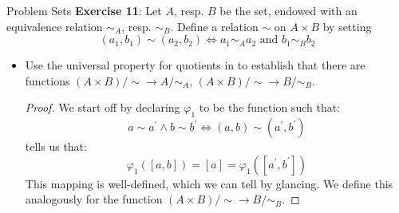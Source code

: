 \documentclass{report}
\begin{document}
\begin{exercises}{Problem Sets}
    \textbf{Exercise 11}: Let $A$, resp. $B$ be the set, endowed with an equivalence relation $\sim_{A}$, resp. $\sim_{B}$. Define a relation $\sim $ on $A \times B$ by setting
        \begin{equation*}
            (a_{1}, b_{1}) \sim (a_{2}, b_{2}) \iff a_{1} \sim_{A} a_{2} \text{ and } b_{1} \sim_{B} b_{2}
        \end{equation*}
        \begin{itemize}
            \item Use the universal property for quotients in  to establish that there are functions $(A \times B)/ \sim \rightarrow A/ \sim_{A}$, $(A \times B) / \sim \rightarrow B/ \sim_{B}$.
                \begin{proof}
                    We start off by declaring $\varphi_{1}$ to be the function such that:
                        \begin{equation*}
                            a \sim a^{\prime} \land b \sim b^{\prime} \iff (a, b) \sim (a^{\prime}, b^{\prime})
                        \end{equation*}
                    tells us that:
                        \begin{equation*}
                            \varphi_{1}([a, b]) = [a] = \varphi_{1}([a^{\prime}, b^{\prime}])
                        \end{equation*}
                    This mapping is well-defined, which we can tell by glancing. We define this analogously for the function $(A \times B)/\sim \rightarrow B/\sim_{B}$.
                \end{proof}


\end{itemize}
\end{exercises}
\end{document}
